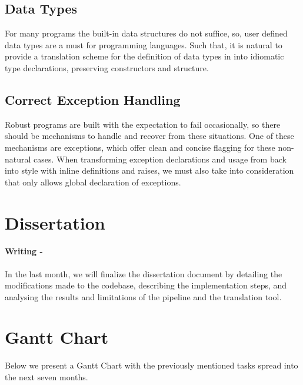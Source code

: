 \subsection{Data Types}

For many programs the built-in data structures do not suffice, so, user defined data types are a must for programming languages.
Such that, it is natural to provide a translation scheme for the definition of data types in \cml into idiomatic \ocaml type declarations, 
preserving constructors and structure.

\subsection{Correct Exception Handling}

Robust programs are built with the expectation to fail occasionally, so there should be mechanisms to handle and recover from these 
situations. One of these mechanisms are exceptions, which offer clean and concise flagging for these non-natural cases.
When transforming exception declarations and usage from \cml back into \ocaml style with inline definitions and raises, we must also take
into consideration that \cml only allows global declaration of exceptions.

\section{Dissertation}


\paragraph{Writing -}
In the last month, we will finalize the dissertation document by detailing the modifications made to the codebase, describing the 
implementation steps, and analysing the results and limitations of the pipeline and the translation tool.

\newpage

\section{Gantt Chart}

Below we present a Gantt Chart with the previously mentioned tasks spread into the next seven months.

